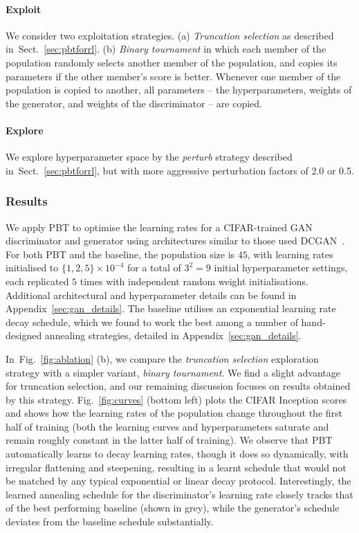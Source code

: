 \documentclass{article} %
\newcommand{\figref}[1]{Fig.~\ref{#1}}
\newcommand{\sref}[1]{Sect.~\ref{#1}}
\begin{document}
\vspace{-0.5em}\paragraph{Exploit}We consider two exploitation strategies.
(a) \emph{Truncation selection} as described in~\sref{sec:pbtforrl}.
(b) \emph{Binary tournament} in which each member of the population randomly selects another member of the population, and copies its parameters if the other member's score is better. Whenever one member of the population is copied to another, all parameters -- the hyperparameters, weights of the generator, and weights of the discriminator -- are copied. 
\vspace{-0.5em}\paragraph{Explore}We explore hyperparameter space by the \emph{perturb} strategy described in~\sref{sec:pbtforrl}, but with more aggressive perturbation factors of 2.0 or 0.5.

\subsubsection{Results}
We apply PBT to optimise the learning rates for a CIFAR-trained GAN discriminator and generator
using architectures similar to those used DCGAN~\citep{dcgan}.
For both PBT and the baseline, the population size is $45$, with learning rates initialised to
$\{1, 2, 5\}\times10^{-4}$
for a total of $3^2 = 9$ initial hyperparameter settings,
each replicated $5$ times with independent random weight initialisations.
Additional architectural and hyperparameter details can be found in Appendix~\ref{sec:gan_details}.
The baseline utilises an exponential learning rate decay schedule, which we found to work the best among a number of hand-designed annealing strategies, detailed in Appendix~\ref{sec:gan_details}.




In~\figref{fig:ablation} (b), we compare the \emph{truncation selection} exploration strategy with a simpler variant, \emph{binary tournament}.
We find a slight advantage for truncation selection,
and our remaining discussion focuses on results obtained by this strategy.
%
\figref{fig:curves} (bottom left) plots the CIFAR Inception scores and shows how the learning rates of the population change throughout the first half of training (both the learning curves and hyperparameters saturate and remain roughly constant in the latter half of training).
We observe that PBT automatically learns to decay learning rates,
though it does so dynamically, with irregular flattening and steepening, resulting in a
learnt schedule that would not be matched by any typical exponential or linear decay protocol.
Interestingly, the learned annealing schedule for the discriminator's learning rate closely tracks that of the best performing baseline (shown in grey), while the generator's schedule deviates from the baseline schedule substantially.
\end{document}
